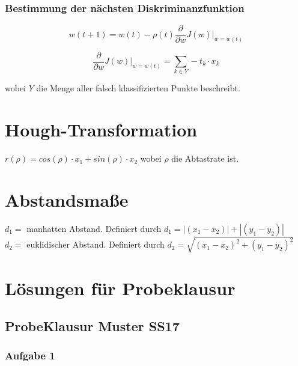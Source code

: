 \documentclass{article}
\begin{document}
\subsubsection{Bestimmung der nächsten Diskriminanzfunktion}
$$ w(t+1) = w(t) -\rho(t) \frac{\partial}{\partial w} J(w) |_{w=w(t)}$$

$$ \frac{\partial}{\partial w} J(w) |_{w=w(t)} = \sum_{k \in Y}^{} -t_k \cdot x_k$$

wobei $Y$ die Menge aller falsch klassifizierten Punkte beschreibt.

\section{Hough-Transformation}

$r(\rho) = cos(\rho) \cdot x_1 + sin(\rho) \cdot x_2$
wobei $\rho$ die Abtastrate ist. 


\section{Abstandsmaße}
$d_1 =$ manhatten Abstand. Definiert durch $d_1 = |(x_1 - x_2)| + |(y_1 - y_2)|$
\\
$d_2 =$ euklidischer Abstand. Definiert durch $d_2=\sqrt{(x_1 - x_2)^2+(y_1 - y_2)^2}$
\\


\newpage
\section{Lösungen für Probeklausur}

\subsection{ProbeKlausur Muster SS17}

\subsubsection{Aufgabe 1}
\end{document}
